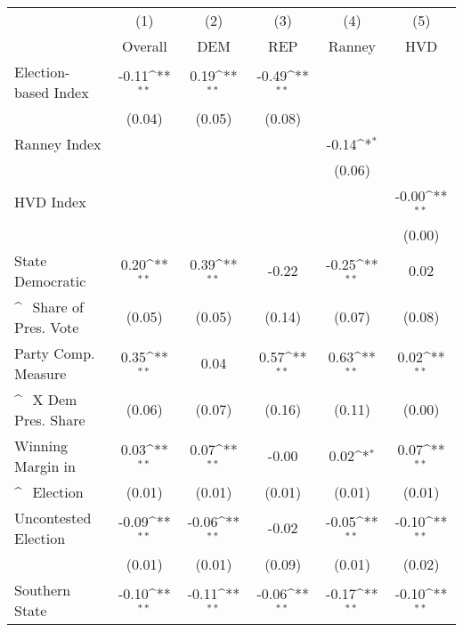 \documentclass[12pt]{article}
\begin{document}
	{
		\def\sym#1{\ifmmode^{#1}\else\(^{#1}\)\fi}
		\begin{tabular}{l|*{3}{c}|*{2}{c}}
			\hline\hline
			&(1)            &(2)            &(3)            &(4)            &(5)            \\
			&Overall        &DEM            &REP            &Ranney         &HVD            \\
			\hline                
			\rule{0pt}{4ex}Election-based Index      &  -0.11\sym{**}&   0.19\sym{**}&  -0.49\sym{**}&               &               \\
			& (0.04)        & (0.05)        & (0.08)        &               &               \\
			\rule{0pt}{2ex}Ranney Index              &               &               &               &  -0.14\sym{*} &               \\
			&               &               &               & (0.06)        &               \\
			\rule{0pt}{2ex}HVD Index                 &               &               &               &               &  -0.00\sym{**}\\
			&               &               &               &               & (0.00)        \\
			\rule{0pt}{2ex}State Democratic    &   0.20\sym{**}&   0.39\sym{**}&  -0.22        &  -0.25\sym{**}&   0.02        \\
			\sym{  } Share of Pres. Vote& (0.05)        & (0.05)        & (0.14)        & (0.07)        & (0.08)        \\
			\rule{0pt}{2ex}Party Comp. Measure &   0.35\sym{**}&   0.04        &   0.57\sym{**}&   0.63\sym{**}&   0.02\sym{**}\\
			\sym{  } X Dem Pres. Share& (0.06)        & (0.07)        & (0.16)        & (0.11)        & (0.00)        \\
			\rule{0pt}{2ex}Winning Margin in         &   0.03\sym{**}&   0.07\sym{**}&  -0.00        &   0.02\sym{*} &   0.07\sym{**}\\
			\sym{  } Election         & (0.01)        & (0.01)        & (0.01)        & (0.01)        & (0.01)        \\
			\rule{0pt}{2ex}Uncontested Election      &  -0.09\sym{**}&  -0.06\sym{**}&  -0.02        &  -0.05\sym{**}&  -0.10\sym{**}\\
			& (0.01)        & (0.01)        & (0.09)        & (0.01)        & (0.02)        \\
			\rule{0pt}{2ex}Southern State            &  -0.10\sym{**}&  -0.11\sym{**}&  -0.06\sym{**}&  -0.17\sym{**}&  -0.10\sym{**}\\

\end{tabular}}
\end{document}
